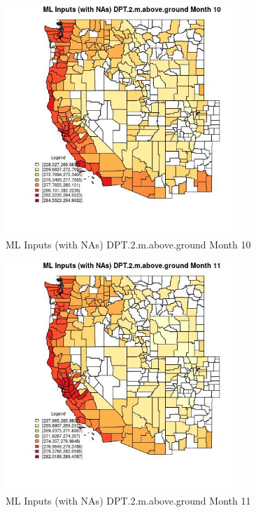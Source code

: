 \begin{figure} 
\centering  
\includegraphics[width=0.77\textwidth]{Code_Outputs/Report_ML_input_PM25_Step4_part_f_de_duplicated_aves_prioritize_24hr_obswNAs_CountyDPT2mabovegroundmedianMonth10.jpg} 
\caption{\label{fig:Report_ML_input_PM25_Step4_part_f_de_duplicated_aves_prioritize_24hr_obswNAsCountyDPT2mabovegroundmedianMonth10}ML Inputs (with NAs) DPT.2.m.above.ground Month 10} 
\end{figure} 
 

\clearpage 

\begin{figure} 
\centering  
\includegraphics[width=0.77\textwidth]{Code_Outputs/Report_ML_input_PM25_Step4_part_f_de_duplicated_aves_prioritize_24hr_obswNAs_CountyDPT2mabovegroundmedianMonth11.jpg} 
\caption{\label{fig:Report_ML_input_PM25_Step4_part_f_de_duplicated_aves_prioritize_24hr_obswNAsCountyDPT2mabovegroundmedianMonth11}ML Inputs (with NAs) DPT.2.m.above.ground Month 11} 
\end{figure} 
 

